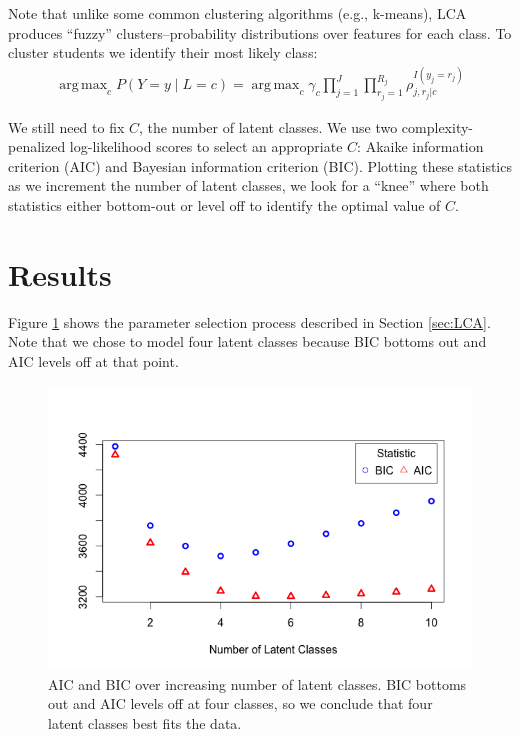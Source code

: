 \documentclass{edm_template}
\DeclareMathOperator*{\argmax}{arg\,max}
\begin{document}
Note that unlike some common clustering algorithms (e.g., k-means), LCA produces ``fuzzy'' clusters--probability distributions over features for each class. To cluster students we  identify their most likely class:
\begin{align}
\argmax_{c} P(Y = y \;|\; L = c) = \argmax_{c} \gamma_{c} \prod_{j=1}^{J} \prod_{r_{j}=1}^{R_{j}} \rho_{j,r_{j}|c}^{I(y_{j} = r_{j})}
\label{eqn:LCA-argmax}
\end{align}

We still need to fix $C$, the number of latent classes. We use two complexity-penalized log-likelihood scores to select an appropriate $C$: Akaike information criterion (AIC) and Bayesian information criterion (BIC). Plotting these statistics as we increment the number of latent classes, we look for a ``knee'' where both statistics either bottom-out or level off to identify the optimal value of $C$.

\section{Results}
\label{sec:results}

Figure \ref{fig:lca-test-statistics} shows the parameter selection process described in Section \ref{sec:LCA}. Note that we chose to model four latent classes because BIC bottoms out and AIC levels off at that point.

\begin{figure}[htbp]
\includegraphics[scale=0.4]{lca-stats-plot.png}
\caption{AIC and BIC over increasing number of latent classes. BIC bottoms out and AIC levels off at four classes, so we conclude that four latent classes best fits the data.}
\label{fig:lca-test-statistics}
\end{figure}
\end{document}
